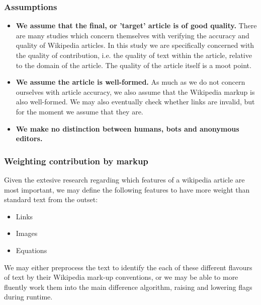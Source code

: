 \documentclass[a4paper,11pt,twoside,notitlepage]{article}
\begin{document}
        \subsubsection*{Assumptions}
        \begin{itemize}
          \item \textbf{We assume that the final, or 'target' article
            is of good quality.} There are many studies which concern
            themselves with verifying the accuracy and quality of
            Wikipedia articles. In this study we are specifically
            concerned with the quality of contribution, i.e. the
            quality of text within the article, relative to the domain
            of the article. The quality of the article itself is a
            moot point.
          \item \textbf{We assume the article is well-formed.} As much
            as we do not concern ourselves with article accuracy, we
            also assume that the Wikipedia markup is also
            well-formed. We may also eventually check whether links
            are invalid, but for the moment we assume that they are.
          \item \textbf{We make no distinction between humans, bots
            and anonymous editors.}
        \end{itemize}
        
        \subsubsection*{Weighting contribution by markup}
        Given the extesive research regarding which features of a
        wikipedia article are most important, we may define the
        following features to have more weight than standard text from
        the outset:
        \begin{itemize}
          \item Links
          \item Images
          \item Equations
        \end{itemize}

        We may either preprocess the text to identify the each of
        these different flavours of text by their Wikipedia mark-up
        conventions, or we may be able to more fluently work them into
        the main difference algorithm, raising and lowering flags
        during runtime.

\end{document}
